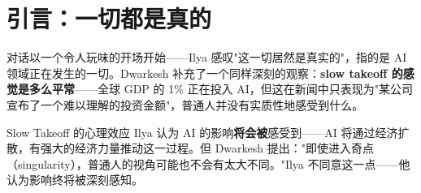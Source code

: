 \section{引言：一切都是真的}

对话以一个令人玩味的开场开始——Ilya 感叹"这一切居然是真实的"，指的是 AI 领域正在发生的一切。Dwarkesh 补充了一个同样深刻的观察：\textbf{slow takeoff 的感觉是多么平常}——全球 GDP 的 1\% 正在投入 AI，但这在新闻中只表现为"某公司宣布了一个难以理解的投资金额"，普通人并没有实质性地感受到什么。

\begin{knowledgebox}{Slow Takeoff 的心理效应}
Ilya 认为 AI 的影响\textbf{将会被}感受到——AI 将通过经济扩散，有强大的经济力量推动这一过程。但 Dwarkesh 提出："即使进入奇点（singularity），普通人的视角可能也不会有太大不同。"Ilya 不同意这一点——他认为影响终将被深刻感知。
\end{knowledgebox}


